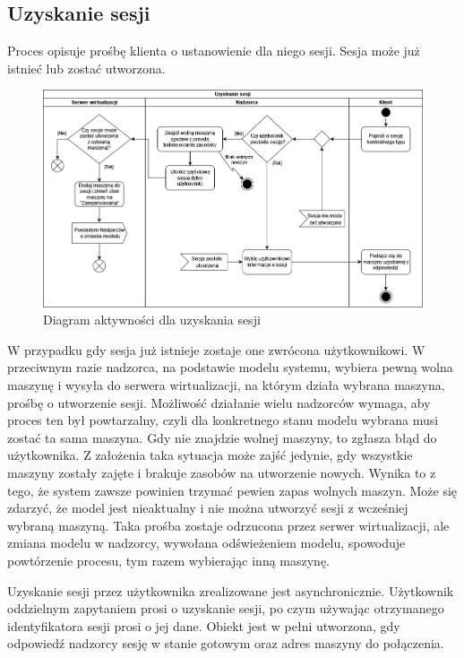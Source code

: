 \documentclass[../opis-rozwiazania.tex]{subfiles}
\begin{document}
\label{diagrams:activity_diagrams}

\subsection{Uzyskanie sesji}

Proces opisuje prośbę klienta o ustanowienie dla niego sesji. Sesja może już istnieć lub zostać utworzona.

\begin{figure}[H]
    \centering
    \includegraphics[width=\textwidth]{../diagrams/activity_diagrams/uzyskanie_sesji_v2.png}
    \caption{Diagram aktywności dla uzyskania sesji}
    \label{start_session}
\end{figure}

W przypadku gdy sesja już istnieje zostaje one zwrócona użytkownikowi.
W przeciwnym razie nadzorca, na podstawie modelu systemu, wybiera pewną wolna maszynę i wysyła do serwera wirtualizacji, na którym działa wybrana maszyna, prośbę o utworzenie sesji. Możliwość działanie wielu nadzorców wymaga, aby proces ten był powtarzalny, czyli dla konkretnego stanu modelu wybrana musi zostać ta sama maszyna.
Gdy nie znajdzie wolnej maszyny, to zgłasza błąd do użytkownika.
Z założenia taka sytuacja może zajść jedynie, gdy wszystkie maszyny zostały zajęte i brakuje zasobów na utworzenie nowych. Wynika to z tego, że system zawsze powinien trzymać pewien zapas wolnych maszyn.
Może się zdarzyć, że model jest nieaktualny i nie można utworzyć sesji z wcześniej wybraną maszyną.
Taka prośba zostaje odrzucona przez serwer wirtualizacji, ale zmiana modelu w nadzorcy, wywołana odświeżeniem modelu, spowoduje powtórzenie procesu, tym razem wybierając inną maszynę.

Uzyskanie sesji przez użytkownika zrealizowane jest asynchronicznie.
Użytkownik oddzielnym zapytaniem prosi o uzyskanie sesji, po czym używając otrzymanego identyfikatora sesji prosi o jej dane.
Obiekt jest w pełni utworzona, gdy odpowiedź nadzorcy sesję w stanie gotowym oraz adres maszyny do połączenia.
\end{document}
